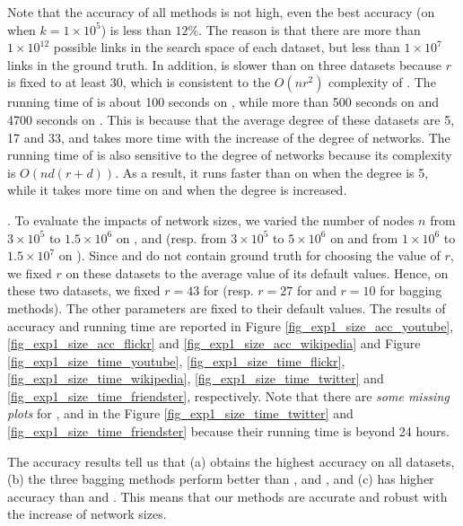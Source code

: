 Note that the accuracy of all methods is not high, even the best
accuracy (\Biased on \Flickr when $k = 1\times 10^5$) is less than $12\%$. The reason is that
there are more than $1\times 10^{12}$ possible links in the search space of each dataset,
but less than $1\times 10^7$ links in the ground truth.
In addition, \NMF is slower than \Aa on three datasets because $r$ is fixed to at least $30$, which is consistent to the
$O(nr^2)$ complexity of \NMF. The running time
of \Aa is about 100 seconds on \YouTube,
while more than 500 seconds on \Flickr and 4700 seconds on \Wikipedia. This is because that the average degree of these datasets are 5, 17 and 33, and \Aa takes more time with the increase of the degree of networks.
The running time of \BIGCLAM is also sensitive to the degree of networks because its complexity is $O(nd(r + d))$.
As a result, it runs faster than
\NMF on \YouTube when the degree is 5, while it takes more time on \Flickr and \Wikipedia
when the degree is increased.






. To evaluate the impacts of network sizes, we varied the
number of nodes $n$ from $3\times 10^5$ to $1.5\times 10^6$ on \YouTube, \Flickr and \Wikipedia (resp.
from $3\times 10^5$ to $5\times 10^6$ on \Twitter and from $1\times 10^6$ to $1.5\times 10^7$ on
\Friendster). Since \Twitter and \Friendster do not contain
ground truth for choosing the value of $r$, we fixed $r$ on these datasets to the average value of
its default values. Hence, on these two datasets, we fixed $r = 43$ for \NMF
(resp. $r = 27$ for \BIGCLAM and $r = 10$ for bagging methods).
The other parameters are fixed to their default values.
The results of accuracy and running time are reported in Figure \ref{fig_exp1_size_acc_youtube},
\ref{fig_exp1_size_acc_flickr} and \ref{fig_exp1_size_acc_wikipedia} and Figure \ref{fig_exp1_size_time_youtube},
\ref{fig_exp1_size_time_flickr}, \ref{fig_exp1_size_time_wikipedia}, \ref{fig_exp1_size_time_twitter} and
\ref{fig_exp1_size_time_friendster}, respectively. Note that there are {\em some missing plots} for \NMF, \Aa and
\BIGCLAM in the Figure \ref{fig_exp1_size_time_twitter} and
\ref{fig_exp1_size_time_friendster} because their running time
is beyond 24 hours.



The accuracy results tell us that (a) \Biased obtains the highest accuracy on all
datasets, (b) the three bagging methods perform better than \NMF, \Aa and \BIGCLAM,
and (c) \NMF has higher accuracy than \Aa and \BIGCLAM. This means that
our methods are accurate and robust with the increase of network sizes.

